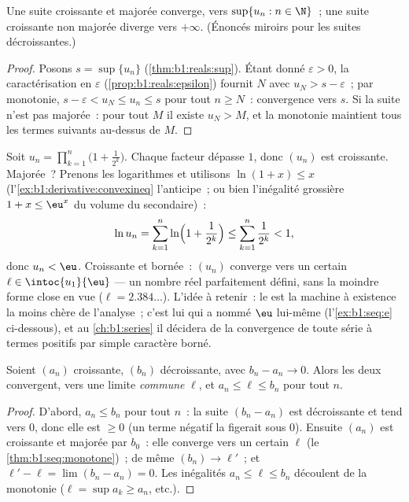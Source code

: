 \begin{theorem}\label{thm:b1:seq:monotone}
Une suite croissante et majorée converge, vers $\sup\{u_n : n \in
\N\}$~; une suite croissante non majorée diverge vers $+\infty$.
(Énoncés miroirs pour les suites
décroissantes.)
\end{theorem}

\begin{proof}
Posons $s = \sup\{u_n\}$ (\cref{thm:b1:reals:sup}). Étant donné
$\varepsilon > 0$, la caractérisation en $\varepsilon$
(\cref{prop:b1:reals:epsilon}) fournit $N$ avec $u_N > s -
\varepsilon$~; par monotonie, $s - \varepsilon < u_N \leq u_n \leq
s$ pour tout $n \geq N$~: convergence vers $s$. Si la suite n'est pas
majorée~: pour tout $M$ il existe $u_N > M$, et la monotonie maintient
tous les termes suivants au-dessus de $M$.
\end{proof}

\begin{example}\label{ex:b1:seq:existencemachine}
Soit $u_n = \prod_{k=1}^{n} \bigl(1 + \frac{1}{2^k}\bigr)$. Chaque
facteur dépasse $1$, donc $(u_n)$ est croissante. Majorée~? Prenons
les logarithmes et utilisons $\ln(1 + x) \leq x$
(l'\cref{ex:b1:derivative:convexineq} l'anticipe~; ou bien
l'inégalité grossière $1 + x \leq \eu^x$ du volume du secondaire)~:
\[
\ln u_n = \sum_{k=1}^{n} \ln\Bigl(1 + \frac{1}{2^k}\Bigr)
\leq \sum_{k=1}^{n} \frac{1}{2^k} < 1 ,
\]
donc $u_n < \eu$. Croissante et bornée~: $(u_n)$ converge vers un
certain $\ell \in \intoc{u_1}{\eu}$ --- un nombre réel parfaitement
défini, sans la moindre forme close en vue ($\ell = 2.384\dots$).
L'idée à retenir~: le  est la machine à
existence la moins chère de l'analyse~; c'est lui qui a nommé $\eu$
lui-même (l'\cref{ex:b1:seq:e} ci-dessous), et au
\cref{ch:b1:series} il décidera de la convergence de toute série à
termes positifs par simple caractère borné.
\end{example}

\begin{theorem}\label{thm:b1:seq:adjacent}
Soient $(a_n)$ croissante, $(b_n)$ décroissante, avec $b_n - a_n \to
0$. Alors les deux convergent, vers une limite \emph{commune} $\ell$,
et $a_n \leq \ell \leq b_n$ pour tout $n$.
\end{theorem}

\begin{proof}
D'abord, $a_n \leq b_n$ pour tout $n$~: la suite $(b_n - a_n)$ est
décroissante et tend vers $0$, donc elle est $\geq 0$ (un terme
négatif la figerait sous $0$). Ensuite $(a_n)$ est croissante et
majorée par $b_0$~: elle converge vers un certain $\ell$ (le
\cref{thm:b1:seq:monotone})~; de même $(b_n) \to \ell'$~; et $\ell' -
\ell = \lim (b_n - a_n) = 0$. Les inégalités $a_n \leq \ell \leq b_n$
découlent de la monotonie ($\ell = \sup a_k \geq a_n$, etc.).
\end{proof}

